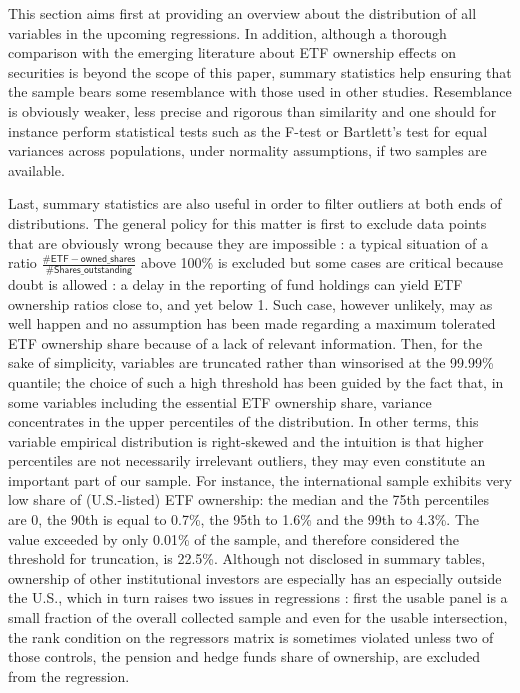 This section aims first at providing an overview about the distribution of all variables in the upcoming regressions. In addition, although a thorough comparison with the emerging literature about ETF ownership effects on securities is beyond the scope of this paper, summary statistics help ensuring that the sample bears some resemblance with those used in other studies. Resemblance is obviously weaker, less precise and rigorous than similarity and one should for instance perform statistical tests such as the F-test or Bartlett's test for equal variances across populations, under normality assumptions, if two samples are available.

Last, summary statistics are also useful in order to filter outliers at both ends of distributions. The general policy for this matter is first to exclude data points that are obviously wrong because they are impossible : a typical situation of a ratio $\frac{\mathsf{\#ETF-owned\_shares}}{\mathsf{\#Shares\_outstanding}}$ above 100\% is excluded but some cases are critical because doubt is allowed : a delay in the reporting of fund holdings can yield ETF ownership ratios close to, and yet below 1. Such case, however unlikely, may as well happen and no assumption has been made regarding a maximum tolerated ETF ownership share because of a lack of relevant information. Then, for the sake of simplicity, variables are truncated rather than winsorised at the 99.99\% quantile; the choice of such a high threshold has been guided by the fact that, in some variables including the essential ETF ownership share, variance concentrates in the upper percentiles of the distribution. In other terms, this variable empirical distribution is right-skewed and the intuition is that higher percentiles are not necessarily irrelevant outliers, they may even constitute an important part of our sample. For instance, the international sample exhibits very low share of (U.S.-listed) ETF ownership: the median and the 75th percentiles are 0, the 90th is equal to 0.7\%, the 95th to 1.6\% and the 99th to 4.3\%. The value exceeded by only 0.01\% of the sample, and therefore considered the threshold for truncation, is 22.5\%. Although not disclosed in summary tables, ownership of other institutional investors are especially has an especially outside the U.S., which in turn raises two issues in regressions : first the usable panel is a small fraction of the overall collected sample and even for the usable intersection, the rank condition on the regressors matrix is sometimes violated unless two of those controls, the pension and hedge funds share of ownership, are excluded from the regression.

